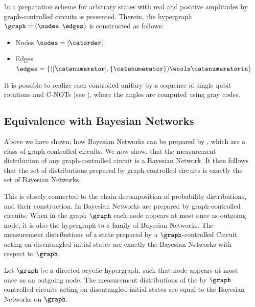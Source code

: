 \begin{example}
    \label{exa:genericControlCircuit}
    In \cite{mottonen_transformation_2005} a preparation scheme for arbitrary states with real and positive amplitudes by graph-controlled circuits is presented.
    Therein, the hypergraph $\graph=(\nodes,\edges)$ is constructed as follows:
    \begin{itemize}
        \item Nodes $\nodes={[\catorder]}$
        \item Edges $\edges=\left\{([\catenumerator],\{\catenumerator\})\wcols\catenumeratorin\right\}$
    \end{itemize}
    It is possible to realize each controlled unitary by a sequence of single qubit rotations and C-NOTs (see \cite{mottonen_transformation_2005}), where the angles are computed using gray codes.
\end{example}


\subsection{Equivalence with Bayesian Networks}

Above we have shown, how Bayesian Networks can be prepared by \activationCircuits{}, which are a class of graph-controlled circuits.
We now show, that the measurement distribution of any graph-controlled circuit is a Bayesian Network.
It then follows that the set of distributions prepared by graph-controlled circuits is exactly the set of Bayesian Networks.


This is closely connected to the chain decomposition of probability distributions, and their construction.
In \cite{low_quantum_2014} Bayesian Networks are prepared by graph-controlled circuits.
When in the graph $\graph$ each node appears at most once as outgoing node, it is also the hypergraph to a family of Bayesian Networks.
The measurement distributions of a state prepared by a $\graph$-controlled Circuit acting on disentangled initial states are exactly the Bayesian Networks with respect to $\graph$.

\begin{theorem}
    \label{the:graphControlledPreparesBN}
    Let $\graph$ be a directed acyclic hypergraph, such that node appears at most once as an outgoing node.
    The measurement distributions of the by $\graph$ controlled circuits acting on disentangled initial states are equal to the Bayesian Networks on $\graph$.
\end{theorem}


